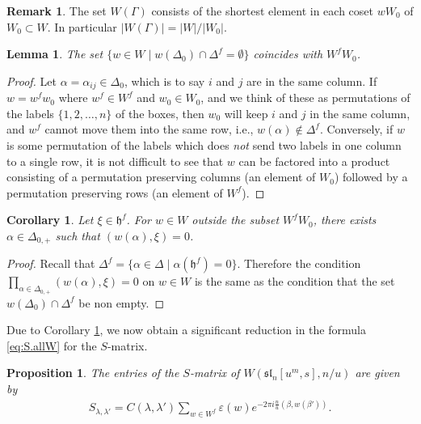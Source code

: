 \documentclass[12pt]{amsart}
\theoremstyle{plain}
\newtheorem{lemma}[thm]{Lemma}
\newtheorem{prop}[thm]{Proposition}
\newtheorem{cor}[thm]{Corollary}
\theoremstyle{definition}
\newtheorem{rem}[thm]{Remark}
\numberwithin{equation}{section}
\newcommand{\al}{\alpha}
\newcommand{\la}{\lambda}
\newcommand{\D}{\Delta}
\newcommand{\h}{\mathfrak{h}}
\newcommand{\sll}{\mathfrak{sl}}
\begin{document}
\begin{rem}
The set $W(\Gamma)$ consists of the shortest element in each coset $wW_0$ of $W_0 \subset W$. In particular $|W(\Gamma)| = |W| / |W_0|$. 
\end{rem}



\begin{lemma}\label{lem:W0Wf}
The set $\{w \in W \mid w(\D_0) \cap \D^f = \emptyset\}$ coincides with $W^f W_0$.
\end{lemma}

\begin{proof}
Let $\al = \al_{ij} \in \D_0$, which is to say $i$ and $j$ are in the same column. If $w = w^f w_0$ where $w^f \in W^f$ and $w_0 \in W_0$, and we think of these as permutations of the labels $\{1, 2, \ldots, n\}$ of the boxes, then $w_0$ will keep $i$ and $j$ in the same column, and $w^f$ cannot move them into the same row, i.e., $w(\al) \notin \D^f$. Conversely, if $w$ is some permutation of the labels which does \emph{not} send two labels in one column to a single row, it is not difficult to see that $w$ can be factored into a product consisting of a permutation preserving columns (an element of $W_0$) followed by a permutation preserving rows (an element of $W^f$).
\end{proof}

\begin{cor}\label{cor:hf.simplification}
Let $\xi \in \h^f$. For $w \in W$ outside the subset $W^f W_0$, there exists $\al \in \D_{0, +}$ such that $(w(\al), \xi) = 0$. 
\end{cor}

\begin{proof}
Recall that $\D^f = \{\al \in \D \mid \al(\h^f) = 0\}$. Therefore the condition $\prod_{\al \in \D_{0, +}} (w(\al), \xi) = 0$ on $w \in W$ is the same as the condition that the set $w(\D_0) \cap \D^f$ be non empty.
\end{proof}

Due to Corollary \ref{cor:hf.simplification}, we now obtain a significant reduction in the formula \eqref{eq:S.allW} for the $S$-matrix.
\begin{prop}
The entries of the $S$-matrix of $W(\sll_n[u^m, s], n/u)$ are given by 
\begin{align}\label{eq:Swf}
S_{\la, \la'} = C(\la, \la') \sum_{w \in W^f} \varepsilon(w) e^{-2\pi i \frac{n}{u} (\beta, w(\beta'))}.
\end{align}
\end{prop}
\end{document}
